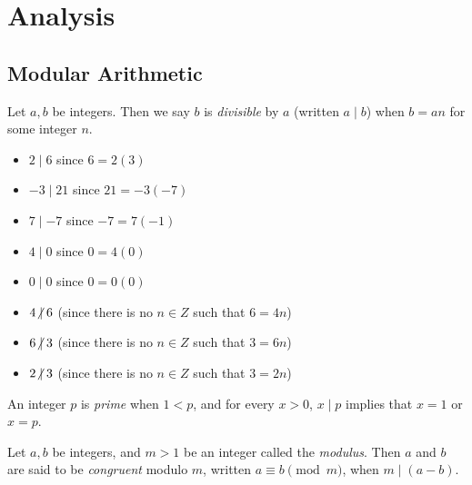 \chapter{Analysis}
\label{ch:analysis}

\section{Modular Arithmetic}

\begin{defn}\label{divisible}
    Let $a, b$ be integers. Then we say $b$ is \emph{divisible} by $a$ (written $a \mid b$) when $b = an$ for some integer $n$.
\end{defn}

\begin{exmp}\proofbreak
    \begin{itemize}
        \item $2 \mid 6$ since $6 = 2(3)$
        \item $-3 \mid 21$ since $21 = -3(-7)$
        \item $7 \mid {-7}$ since $-7 = 7(-1)$
        \item $4 \mid 0$ since $0 = 4(0)$
        \item $0 \mid 0$ since $0 = 0(0)$
    \end{itemize}
\end{exmp}

\begin{exmp}\proofbreak
    \begin{itemize}
        \item $4 \centernot\mid 6$ (since there is no $n \in Z$ such that $6 = 4n$)
        \item $6 \centernot\mid 3$ (since there is no $n \in Z$ such that $3 = 6n$)
        \item $2 \centernot\mid 3$ (since there is no $n \in Z$ such that $3 = 2n$)
    \end{itemize}
\end{exmp}

\begin{defn}
    An integer $p$ is \emph{prime} when $1 < p$, and for every $x > 0$, $x \mid p$ implies that $x = 1$ or $x = p$.
\end{defn}

\begin{defn}\label{modular-congruence}
    Let $a, b$ be integers, and $m > 1$ be an integer called the \emph{modulus}. Then $a$ and $b$ are said to be \emph{congruent} modulo $m$, written $a \equiv b \pmod m$, when $m\mid(a - b)$.
\end{defn}

